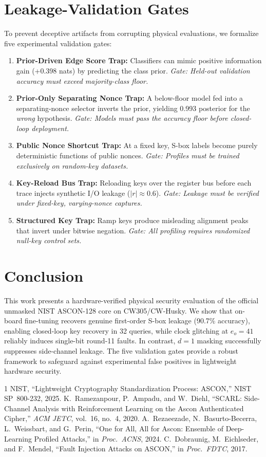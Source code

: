 \documentclass[conference]{IEEEtran}
\begin{document}
\section{Leakage-Validation Gates}
\label{sec:gates}
To prevent deceptive artifacts from corrupting physical evaluations, we formalize five experimental validation gates:
\begin{enumerate}[nosep,leftmargin=1.2em]
\item \textbf{Prior-Driven Edge Score Trap:} Classifiers can mimic positive information gain (+0.398 nats) by predicting the class prior. \emph{Gate: Held-out validation accuracy must exceed majority-class floor.}
\item \textbf{Prior-Only Separating Nonce Trap:} A below-floor model fed into a separating-nonce selector inverts the prior, yielding 0.993 posterior for the \emph{wrong} hypothesis. \emph{Gate: Models must pass the accuracy floor before closed-loop deployment.}
\item \textbf{Public Nonce Shortcut Trap:} At a fixed key, S-box labels become purely deterministic functions of public nonces. \emph{Gate: Profiles must be trained exclusively on random-key datasets.}
\item \textbf{Key-Reload Bus Trap:} Reloading keys over the register bus before each trace injects synthetic I/O leakage ($|r|\approx0.6$). \emph{Gate: Leakage must be verified under fixed-key, varying-nonce captures.}
\item \textbf{Structured Key Trap:} Ramp keys produce misleading alignment peaks that invert under bitwise negation. \emph{Gate: All profiling requires randomized null-key control sets.}
\end{enumerate}

\section{Conclusion}
This work presents a hardware-verified physical security evaluation of the official unmasked NIST ASCON-128 core on CW305/CW-Husky. We show that on-board fine-tuning recovers genuine first-order S-box leakage (90.7\% accuracy), enabling closed-loop key recovery in 32 queries, while clock glitching at $e_o{=}41$ reliably induces single-bit round-11 faults. In contrast, $d{=}1$ masking successfully suppresses side-channel leakage. The five validation gates provide a robust framework to safeguard against experimental false positives in lightweight hardware security.

\begin{thebibliography}{1}\setlength{\itemsep}{0pt}\footnotesize
{} NIST, ``Lightweight Cryptography Standardization Process: ASCON,'' NIST SP~800-232, 2025.
 K.~Ramezanpour, P.~Ampadu, and W.~Diehl, ``SCARL: Side-Channel Analysis with Reinforcement Learning on the Ascon Authenticated Cipher,'' \textit{ACM JETC}, vol.~16, no.~4, 2020.
 A.~Rezaeezade, N.~Basurto-Becerra, L.~Weissbart, and G.~Perin, ``One for All, All for Ascon: Ensemble of Deep-Learning Profiled Attacks,'' in \textit{Proc.\ ACNS}, 2024.
 C.~Dobraunig, M.~Eichlseder, and F.~Mendel, ``Fault Injection Attacks on ASCON,'' in \textit{Proc.\ FDTC}, 2017.
\end{thebibliography}
\end{document}
